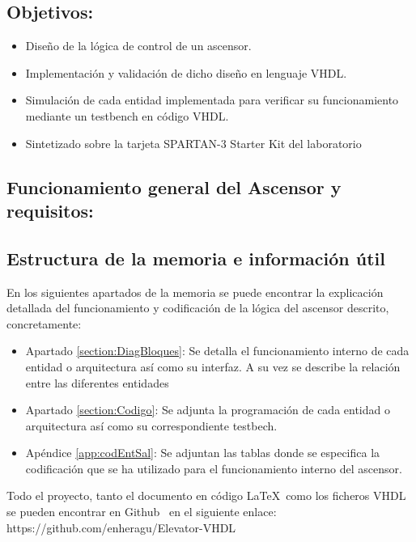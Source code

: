 

\subsection{Objetivos:}
    \begin{itemize}
        \item Diseño de la lógica de control de un ascensor.
        \item Implementación y validación de dicho diseño en lenguaje VHDL.
        \item Simulación de cada entidad implementada para verificar su funcionamiento mediante un testbench en código VHDL.
        \item Sintetizado sobre la tarjeta SPARTAN-3 Starter Kit del laboratorio
    \end{itemize}
    
\subsection{Funcionamiento general del Ascensor y requisitos:}

\subsection{Estructura de la memoria e información útil}

    En los siguientes apartados de la memoria se puede encontrar la explicación detallada del funcionamiento y codificación de la lógica del ascensor descrito, concretamente:
    \begin{itemize}
        \item Apartado \ref{section:DiagBloques}: Se detalla el funcionamiento interno de cada entidad o arquitectura así como su interfaz. A su vez se describe la relación entre las diferentes entidades
        \item Apartado \ref{section:Codigo}: Se adjunta la programación de cada entidad o arquitectura así como su correspondiente testbech.
        \item Apéndice \ref{app:codEntSal}: Se adjuntan las tablas donde se especifica la codificación que se ha utilizado para el funcionamiento interno del ascensor.
    \end{itemize}
    
    Todo el proyecto, tanto el documento en código \LaTeX\  como los ficheros VHDL se pueden encontrar en Github \faGithub\ en el siguiente enlace: https://github.com/enheragu/Elevator-VHDL
